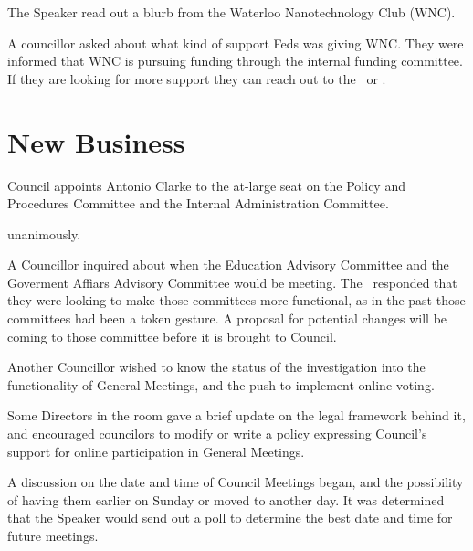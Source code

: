 
\begin{information}

    The Speaker read out a blurb from the Waterloo Nanotechnology Club (WNC). 

    A councillor asked about what kind of support Feds was giving WNC. They 
    were informed that WNC is pursuing funding through the internal funding 
    committee. If they are looking for more support they can reach out to 
    the \vpof\ or \vpi. 
\end{information}

\section*{New Business}


\begin{motion}
    \birt Council appoints Antonio Clarke to the at-large seat on the Policy
    and Procedures Committee and the Internal Administration Committee. 
    \movers{\brian}{\tomson}

    \carries unanimously.
\end{motion}

\begin{information}

    A Councillor inquired about when the Education Advisory Committee and the
    Goverment Affiars Advisory Committee would be meeting. The \vped\ responded
    that they were looking to make those committees more functional, as in the
    past those committees had been a token gesture. A proposal for potential
    changes will be coming to those committee before it is brought to Council. 

    Another Councillor wished to know the status of the investigation into the 
    functionality of General Meetings, and the push to implement online voting.
    
    Some Directors in the room gave a brief update on the legal framework behind
    it, and encouraged councilors to modify or write a policy expressing
    Council's support for online participation in General Meetings. 

\end{information}

\begin{information}

    A discussion on the date and time of Council Meetings began, 
    and the possibility of having them earlier on Sunday or moved to another
    day. It was determined that the Speaker would send out a poll
    to determine the best date and time for future meetings. 

\end{information}


